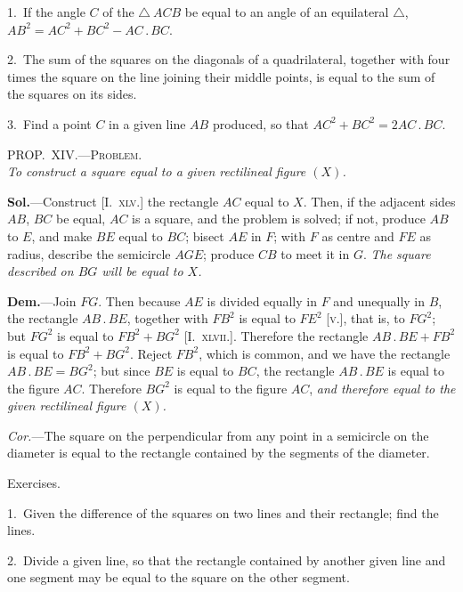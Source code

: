\documentclass[oneside]{book}
\newcommand\myprop[2]{
\bigskip\Needspace*{4\baselineskip}\begin{center}\textsc{#1}\\\medskip\emph{#2}\par\end{center}
}
\newcommand\exhead[1]{
\Needspace*{5\baselineskip}\begin{center}
\textsf{#1}
\end{center}
}
\newcommand\imgcent[2]{
\begin{center}

\end{center}
}
\begin{document}
\begin{footnotesize}
1.~If the angle $C$ of the $\triangle~ACB$ be equal to an angle of an
equilateral $\triangle$, $AB^2 = AC^2 + BC^2 - AC\,.\,BC$.

2.~The sum of the squares on the diagonals of a quadrilateral,
together with four times the square on the line joining their
middle points, is equal to the sum of the squares on its sides.

3.~Find a point $C$ in a given line $AB$ produced, so that
$AC^2 + BC^2 = 2AC\,.\,BC$.
\par\end{footnotesize}


\myprop{PROP\@.~XIV\@.---Problem.}{To construct a square equal to a given rectilineal figure $(X)$.}


\imgcent{225}{f099}

\textbf{Sol.}---Construct [I.~\textsc{xlv.}] the rectangle $AC$ equal to
$X$. Then, if the adjacent sides $AB$, $BC$ be equal, $AC$
is a square, and the problem is solved; if not, produce
$AB$ to $E$, and make $BE$ equal to $BC$; bisect $AE$ in $F$;
with $F$ as centre and $FE$ as radius, describe the semicircle
$AGE$; produce $CB$ to meet it in $G$. \textit{The square
described on $BG$ will be equal to $X$.}

\textbf{Dem.}---Join $FG$. Then because $AE$ is divided
equally in $F$ and unequally in $B$, the rectangle $AB\,.\,BE$,
together with $FB^{2}$ is equal to $FE^{2}$ [\textsc{v.}], that is, to $FG^{2}$;
but $FG^{2}$ is equal to $FB^{2} + BG^{2}$ [I.~\textsc{xlvii.}]. Therefore
the rectangle $AB\,.\,BE + FB^{2}$ is equal to $FB^{2} + BG^{2}$.
Reject $FB^{2}$, which is common, and we have the rectangle
$AB\,.\,BE = BG^{2}$; but since $BE$ is equal to $BC$,
the rectangle $AB\,.\,BE$ is equal to the figure $AC$.
Therefore $BG^{2}$ is equal to the figure $AC$, \textit{and therefore
equal to the given rectilineal figure $(X)$.}

\textit{Cor.}---The square on the perpendicular from any
point in a semicircle on the diameter is equal to the
rectangle contained by the segments of the diameter.



\exhead{Exercises.}

\begin{footnotesize}
1.~Given the difference of the squares on two lines and their
rectangle; find the lines.

2.~Divide a given line, so that the rectangle contained by
another given line and one segment may be equal to the square
on the other segment.
\par\end{footnotesize}
\end{document}
